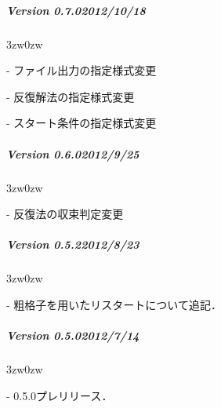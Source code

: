 { \small

%
\subparagraph{Version 0.7.0\hspace{1cm}2012/10/18}

\begin{description}
\begin{indentation}{3zw}{0zw}
\item[-] ファイル出力の指定様式変更
\item[-] 反復解法の指定様式変更
\item[-] スタート条件の指定様式変更
\end{indentation}
\end{description}
\vspace{3mm}


%
\subparagraph{Version 0.6.0\hspace{1cm}2012/9/25}

\begin{description}
\begin{indentation}{3zw}{0zw}
\item[-] 反復法の収束判定変更
\end{indentation}
\end{description}
\vspace{3mm}

%
\subparagraph{Version 0.5.2\hspace{1cm}2012/8/23}

\begin{description}
\begin{indentation}{3zw}{0zw}
\item[-] 粗格子を用いたリスタートについて追記．
\end{indentation}
\end{description}
\vspace{3mm}

%
\subparagraph{Version 0.5.0\hspace{1cm}2012/7/14}

\begin{description}
\begin{indentation}{3zw}{0zw}
\item[-] 0.5.0プレリリース．
\end{indentation}
\end{description}

} %
